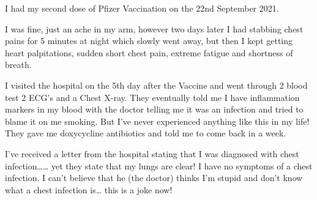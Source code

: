 I had my second dose of Pfizer Vaccination on the 22nd September 2021.

I was fine, just an ache in my arm, however two days later I had stabbing chest
pains for 5 minutes at night which slowly went away, but then I kept getting
heart palpitations, sudden short chest pain, extreme fatigue and shortness of
breath.

I visited the hospital on the 5th day after the Vaccine and went through 2 blood
test 2 ECG’s and a Chest X-ray. They eventually told me I have inflammation
markers in my blood with the doctor telling me it was an infection and tried to
blame it on me smoking. But I’ve never experienced anything like this in my
life! They gave me doxycycline antibiotics and told me to come back in a week.

I’ve received a letter from the hospital stating that I was diagnosed with chest
infection…… yet they state that my lungs are clear! I have no symptoms of a
chest infection. I can’t believe that he (the doctor) thinks I’m stupid and
don’t know what a chest infection is… this is a joke now!


